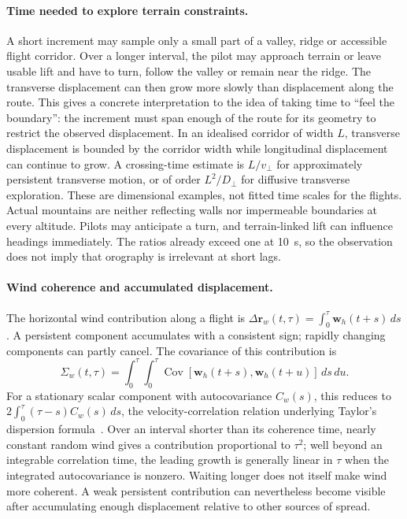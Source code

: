 \paragraph{Time needed to explore terrain constraints.}
A short increment may sample only a small part of a valley, ridge or accessible
flight corridor. Over a longer interval, the pilot may approach terrain or leave
usable lift and have to turn, follow the valley or remain near the ridge. The
transverse displacement can then grow more slowly than displacement along the
route. This gives a concrete interpretation to the idea of taking time to
``feel the boundary'': the increment must span enough of the route for its
geometry to restrict the observed displacement. In an idealised corridor of
width $L$, transverse displacement is bounded by the corridor width while
longitudinal displacement can continue to grow. A crossing-time estimate is
$L/v_\perp$ for approximately persistent transverse motion, or of order
$L^2/D_\perp$ for diffusive transverse exploration. These are dimensional
examples, not fitted time scales for the flights. Actual mountains are neither
reflecting walls nor impermeable boundaries at every altitude. Pilots may
anticipate a turn, and terrain-linked lift can influence headings immediately.
The ratios already exceed one at 10~s, so the observation does not imply that
orography is irrelevant at short lags.

\FloatBarrier
\paragraph{Wind coherence and accumulated displacement.}
The horizontal wind contribution along a flight is
$\Delta\mathbf r_w(t,\tau)=\int_0^\tau\mathbf w_h(t+s)\,ds$.
A persistent component accumulates with a consistent sign; rapidly changing
components can partly cancel. The covariance of this contribution is
\begin{equation}
 \Sigma_w(t,\tau)=\int_0^\tau\!\int_0^\tau
 \operatorname{Cov}[\mathbf w_h(t+s),\mathbf w_h(t+u)]\,ds\,du.
 \label{eq:wind-integrated-covariance}
\end{equation}
For a stationary scalar component with autocovariance $C_w(s)$, this reduces to
$2\int_0^\tau(\tau-s)C_w(s)\,ds$, the velocity-correlation relation underlying
Taylor's dispersion formula~\cite{taylor1922}. Over an interval shorter than its coherence
time, nearly constant random wind gives a contribution proportional to $\tau^2$;
well beyond an integrable correlation time, the leading growth is generally
linear in $\tau$ when the integrated autocovariance is nonzero. Waiting longer
does not itself make wind more coherent. A weak persistent contribution can
nevertheless become visible after accumulating enough displacement relative to
other sources of spread.

